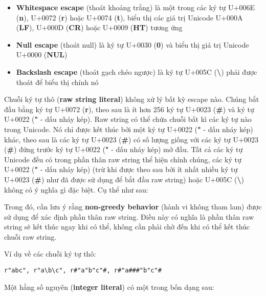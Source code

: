     \begin{itemize}
    \item{\textbf{Whitespace escape} (thoát khoảng trắng) là một trong các ký tự U+006E (\textbf{n}), U+0072 (\textbf{r}) hoặc U+0074 (\textbf{t}), biểu thị các giá trị Unicode U+000A (\textbf{LF}), U+000D (\textbf{CR}) hoặc U+0009 (\textbf{HT}) tương ứng}
    \item{\textbf{Null escape} (thoát null) là ký tự U+0030 (\textbf{0}) và biểu thị giá trị Unicode U+0000 (\textbf{NUL})}
    \item{\textbf{Backslash escape} (thoát gạch chéo ngược) là ký tự U+005C (\textbf{\textbackslash}) phải được thoát để biểu thị chính nó}
    \end{itemize}

    Chuỗi ký tự thô (\textbf{raw string literal}) không xử lý bất kỳ escape nào. Chúng bắt đầu bằng ký tự U+0072 (\textbf{r}), theo sau là ít hơn 256 ký tự U+0023 (\textbf{\#}) và ký tự U+0022 (\textbf{"} - dấu nháy kép). Raw string có thể chứa chuỗi bất kì các ký tự nào trong Unicode. Nó chỉ được kết thúc bởi một ký tự U+0022 (\textbf{"} - dấu nháy kép) khác, theo sau là các ký tự U+0023 (\textbf{\#}) có số lượng giống với các ký tự U+0023 (\textbf{\#}) đứng trước ký tự U+0022 (\textbf{"} - dấu nháy kép) mở đầu. Tất cả các ký tự Unicode đều có trong phần thân raw string thể hiện chính chúng, các ký tự U+0022 (\textbf{"} - dấu nháy kép) (trừ khi được theo sau bởi ít nhất nhiều ký tự U+0023 (\textbf{\#}) như đã được sử dụng để bắt đầu raw string) hoặc U+005C (\textbf{\textbackslash}) không có ý nghĩa gì đặc biệt. Cụ thể như sau:

    \regexrawstringliteral

\noindent Trong đó, cần lưu ý rằng \textbf{non-greedy behavior} (hành vi không tham lam) được sử dụng để xác định phần thân raw string. Điều này có nghĩa là phần thân raw string sẽ kết thúc ngay khi có thể, không cần phải chờ đến khi có thể kết thúc chuỗi raw string.

\noindent Ví dụ về các chuỗi ký tự thô:
\begin{lstlisting}[]
r"abc", r"a\b\c", r#"a"b"c"#, r#"a###"b"c"#
\end{lstlisting}

    Một hằng số nguyên (\textbf{integer literal}) có một trong bốn dạng sau:

